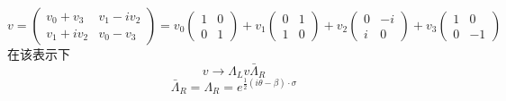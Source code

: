 \begin{equation}
v=\left(\begin{array}{cc}
v_{0}+v_{3} & v_{1}-i v_{2} \\
v_{1}+i v_{2} & v_{0}-v_{3}
\end{array}\right)=v_{0}\left(\begin{array}{cc}
1 & 0 \\
0 & 1
\end{array}\right)+v_{1}\left(\begin{array}{cc}
0 & 1 \\
1 & 0
\end{array}\right)+v_{2}\left(\begin{array}{cc}
0 & -i \\
i & 0
\end{array}\right)+v_{3}\left(\begin{array}{cc}
1 & 0 \\
0 & -1
\end{array}\right)
\end{equation}
在该表示下
\begin{equation}
v\rightarrow\Lambda_{L}v \bar{\Lambda}_{R}
\end{equation}
\begin{equation}
\bar{\Lambda}_{R}=\Lambda_{R}=e^{\frac{1}{2}(i \theta-\beta) \cdot \sigma}
\end{equation}
